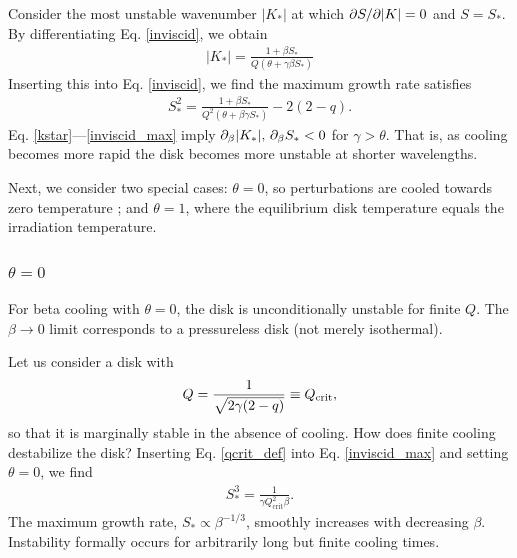 Consider the most unstable wavenumber $|K_*|$ at which $\partial S/\partial|K| =
0$ and $S = S_*$. By differentiating Eq. \ref{inviscid}, we obtain 
\begin{align}\label{kstar}
  |K_*| = \frac{1+\beta S_*}{Q\left(\theta + \gamma \beta S_*\right)}
\end{align}
Inserting this into Eq. \ref{inviscid}, we find the maximum growth
rate satisfies
\begin{align}\label{inviscid_max}
  S_*^2 = \frac{1+\beta S_*}{Q^2\left(\theta + \beta\gamma S_*\right)}
  - 2(2-q).
\end{align}
Eq. \ref{kstar}---\ref{inviscid_max} imply $\partial_\beta|K_*|,\,\partial_\beta
S_*<0 $ for $\gamma>\theta$. That is, as cooling becomes more rapid
the disk becomes more unstable at shorter wavelengths. 

Next, we consider two special cases: $\theta=0$, so perturbations are
cooled towards zero temperature \citep[typically employed in
numerical simulations, e.g.][]{gammie01}; and $\theta=1$, where the
equilibrium disk temperature equals the irradiation temperature.  

\subsubsection{$\theta = 0$}\label{theta0}
For beta cooling with $\theta=0$, the disk is unconditionally unstable
for finite $Q$.  The $\beta\to0$ limit corresponds to a 
pressureless disk (not merely isothermal).   

Let us consider a disk with 
\begin{align}\label{qcrit_def}
  Q = \frac{1}{\sqrt{2\gamma(2-q)}}\equiv Q_{\mathrm{crit}},
\end{align} 
so that it is marginally stable in the absence of cooling.  
How does finite cooling destabilize the disk?  
Inserting Eq. \ref{qcrit_def} into Eq. \ref{inviscid_max} and setting
$\theta=0$, we find 
\begin{align}\label{sstar}
  S_*^3 = \frac{1}{\gamma Q_\mathrm{crit}^2 \beta}. 
\end{align}
The maximum growth rate, $S_*\propto \beta^{-1/3}$, smoothly
increases with decreasing $\beta$. Instability formally occurs for
arbitrarily long but finite cooling times. 


